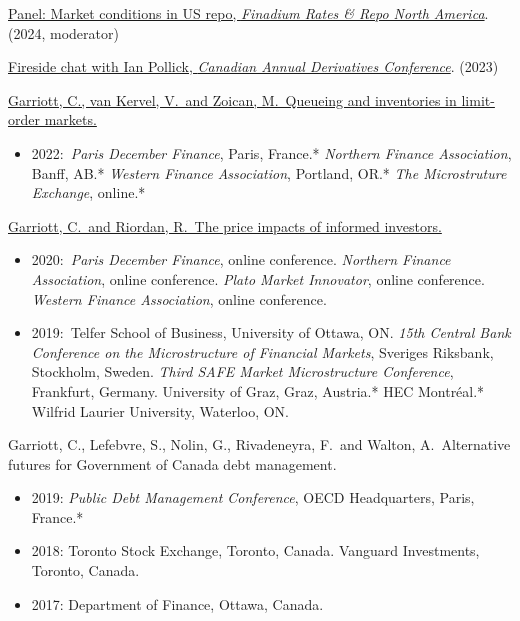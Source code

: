 \documentclass[11pt,letterpaper]{article}
\begin{document}
\noindent \href{https://finadium.com/rates-repo-na-2024/market-conditions-in-us-repo/}{Panel: Market conditions in US repo, \textit{Finadium Rates \& Repo North America}}. (2024, moderator)

\medskip
\noindent \href{https://cadc.m-x.ca/2023/program/}{Fireside chat with Ian Pollick, \textit{Canadian Annual Derivatives Conference}}. (2023)

\medskip
{}
\noindent \href{https://www.sciencedirect.com/science/article/pii/S1386418125000229}{Garriott, C., van Kervel, V.~and Zoican, M.~Queueing and inventories in limit-order markets.}
\begin{itemize}[noitemsep]
  \item 2022:~\textit{Paris December Finance}, Paris, France.* \textit{Northern Finance Association}, Banff, AB.* \textit{Western Finance Association}, Portland, OR.* \textit{The Microstruture Exchange}, online.*
\end{itemize}


\medskip
\noindent \href{https://papers.ssrn.com/sol3/papers.cfm?abstract_id=4866008}{Garriott, C.~and Riordan, R.~The price impacts of informed investors.}
\begin{itemize}[noitemsep]
  \item 2020:~\textit{Paris December Finance}, online conference. \textit{Northern Finance Association}, online conference. \textit{Plato Market Innovator}, online conference. \textit{Western Finance Association}, online conference.
  \item 2019:~Telfer School of Business, University of Ottawa, ON. \textit{15th Central Bank Conference on the Microstructure of Financial Markets}, Sveriges Riksbank, Stockholm, Sweden. \textit{Third SAFE Market Microstructure Conference}, Frankfurt, Germany. University of Graz, Graz, Austria.* HEC Montr\'eal.* Wilfrid Laurier University, Waterloo, ON.
\end{itemize}


\medskip
\noindent Garriott, C., Lefebvre, S., Nolin, G., Rivadeneyra, F.~and Walton, A.~Alternative futures for Government of Canada debt management.
\begin{itemize}[noitemsep]
  \item 2019: \textit{Public Debt Management Conference}, OECD Headquarters, Paris, France.*
  \item 2018: Toronto Stock Exchange, Toronto, Canada. Vanguard Investments, Toronto, Canada.
  \item 2017: Department of Finance, Ottawa, Canada.
\end{itemize}
\end{document}
